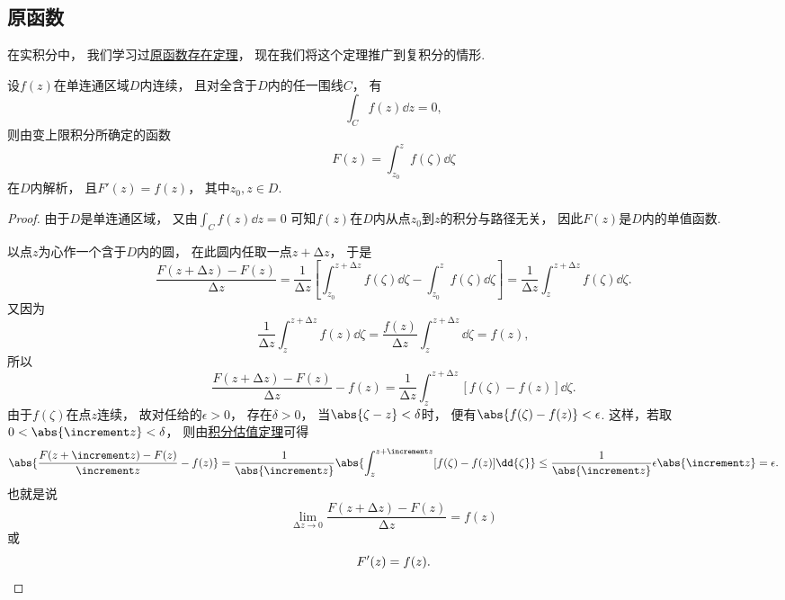 \subsection{原函数}
在实积分中，
我们学习过\hyperref[theorem:定积分.原函数存在定理]{原函数存在定理}，
现在我们将这个定理推广到复积分的情形.
\begin{theorem}\label{theorem:解析函数的积分表示.原函数1}
设\(f(z)\)在单连通区域\(D\)内连续，
且对全含于\(D\)内的任一围线\(C\)，
有\begin{equation*}
	\int_C f(z) \dd{z} = 0,
\end{equation*}
则由变上限积分所确定的函数\begin{equation*}
	F(z) = \int_{z_0}^z f(\zeta) \dd{\zeta}
\end{equation*}在\(D\)内解析，
且\(F'(z) = f(z)\)，
其中\(z_0, z \in D\).
\begin{proof}
由于\(D\)是单连通区域，
又由\(\int_C f(z) \dd{z}=0\)
可知\(f(z)\)在\(D\)内从点\(z_0\)到\(z\)的积分与路径无关，
因此\(F(z)\)是\(D\)内的单值函数.

以点\(z\)为心作一个含于\(D\)内的圆，
在此圆内任取一点\(z+\increment z\)，
于是\begin{equation*}
	\frac{F(z+\increment z)-F(z)}{\increment z}
	= \frac{1}{\increment z}
		\left[
			\int_{z_0}^{z+\increment z} f(\zeta) \dd{\zeta}
			-\int_{z_0}^z f(\zeta) \dd{\zeta}
		\right]
	= \frac{1}{\increment z} \int_z^{z+\increment z} f(\zeta) \dd{\zeta}.
\end{equation*}
又因为\begin{equation*}
	\frac{1}{\increment z} \int_z^{z+\increment z} f(z) \dd{\zeta}
	= \frac{f(z)}{\increment z} \int_z^{z+\increment z} \dd{\zeta} = f(z),
\end{equation*}
所以\begin{equation*}
	\frac{F(z+\increment z)-F(z)}{\increment z} - f(z)
	= \frac{1}{\increment z} \int_z^{z+\increment z} [f(\zeta)-f(z)]\dd{\zeta}.
\end{equation*}
由于\(f(\zeta)\)在点\(z\)连续，
故对任给的\(\epsilon > 0\)，
存在\(\delta > 0\)，
当\(\abs{\zeta - z} < \delta\)时，
便有\(\abs{f(\zeta)-f(z)} < \epsilon\).
这样，若取\(0<\abs{\increment z}<\delta\)，
则由\hyperref[theorem:解析函数的积分表示.积分估值定理]{积分估值定理}可得\begin{equation*}
	\abs{\frac{F(z+\increment z)-F(z)}{\increment z} - f(z)}
	= \frac{1}{\abs{\increment z}} \abs{ \int_z^{z+\increment z} [f(\zeta)-f(z)]\dd{\zeta} }
	\leq \frac{1}{\abs{\increment z}} \epsilon \abs{\increment z}
	= \epsilon.
\end{equation*}
也就是说\begin{equation*}
	\lim_{\increment z\to0} \frac{F(z+\increment z)-F(z)}{\increment z} = f(z)
\end{equation*}或\begin{equation*}
	F'(z) = f(z).
	\qedhere
\end{equation*}
\end{proof}
\end{theorem}

